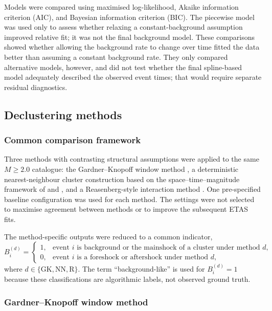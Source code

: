 Models were compared using maximised log-likelihood, Akaike information
criterion (AIC), and Bayesian information criterion (BIC). The piecewise
model was used only to assess whether relaxing a constant-background
assumption improved relative fit; it was not the final background model.
These comparisons showed whether allowing the background rate to change over
time fitted the data better than assuming a constant background rate. They
only compared alternative models, however, and did not test whether the final
spline-based model adequately described the observed event times; that would
require separate residual diagnostics.

\subsection{Declustering methods}
\label{sec:declustering}

\subsubsection{Common comparison framework}

Three methods with contrasting structural assumptions were applied to the
same $M\geq2.0$ catalogue: the Gardner--Knopoff window method
\citep{gardner1974}, a deterministic nearest-neighbour cluster construction
based on the space--time--magnitude framework of \citet{zaliapin2013} and
\citet{zaliapin2020declustering}, and a Reasenberg-style interaction method
\citep{reasenberg1985}. One pre-specified baseline configuration was used for
each method. The settings were not selected to maximise agreement between
methods or to improve the subsequent ETAS fits.

The method-specific outputs were reduced to a common indicator,
\[
B_i^{(d)}=
\begin{cases}
1, & \text{event $i$ is background or the mainshock of a cluster under method $d$},\\
0, & \text{event $i$ is a foreshock or aftershock under method $d$},
\end{cases}
\]
where $d\in\{\mathrm{GK},\mathrm{NN},\mathrm{R}\}$. The term
``background-like'' is used for $B_i^{(d)}=1$ because these classifications
are algorithmic labels, not observed ground truth.

\subsubsection{Gardner--Knopoff window method}

